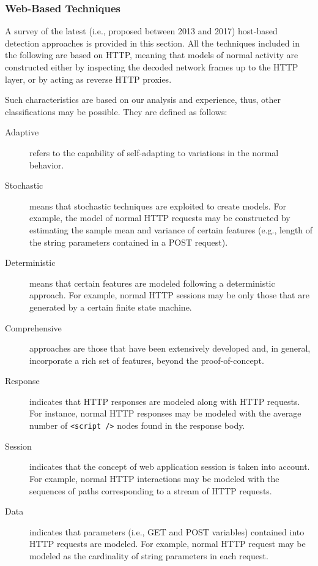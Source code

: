 \documentclass[12pt]{article}
\theoremstyle{definition}
\begin{document}
			
			\subsubsection{Web-Based Techniques}
			A survey of the latest (i.e., proposed
			between 2013 and 2017) host-based detection approaches is provided in this section. All the techniques included in the following are based on HTTP, meaning that models of normal activity are
			constructed either by inspecting the decoded network frames up to the HTTP layer, or by acting as reverse
			HTTP proxies.
			
			Such
			characteristics are based on our analysis and experience, thus, other
			classifications may be possible. They are defined as follows:
			
			\begin{description}
				\item[Adaptive] refers to the capability of self-adapting to
				variations in the normal behavior.
				\item[Stochastic] means that stochastic techniques are exploited to
				create models. For example, the model of normal HTTP
				requests may be constructed by estimating the sample mean and variance
				of certain features (e.g., length of the string parameters contained
				in a POST request).
				\item[Deterministic] means that certain features are modeled following
				a deterministic approach. For example, normal HTTP
				sessions may be only those that are generated by a certain finite
				state machine.
				\item[Comprehensive] approaches are those that have been extensively
				developed and, in general, incorporate a rich set of features, beyond
				the proof-of-concept.
				\item[Response] indicates that HTTP responses are
				modeled along with HTTP requests. For instance,
				normal HTTP responses may be modeled with the average
				number of \texttt{<script />} nodes found in the response body.
				\item[Session] indicates that the concept of web application session
				is taken into account. For example, normal HTTP
				interactions may be modeled with the sequences of paths corresponding
				to a stream of HTTP requests.
				\item[Data] indicates that parameters (i.e., GET and POST variables)
				contained into HTTP requests are modeled. For
				example, normal HTTP request may be modeled as the cardinality of string parameters in each request.
			\end{description}
			
\end{document}
